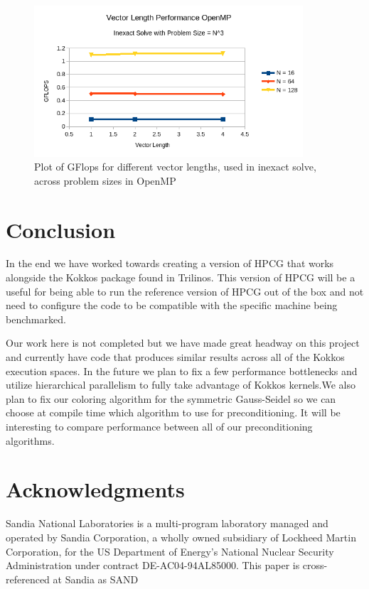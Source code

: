 \documentclass{ccr15}
\begin{document}
\begin{figure}[H]
  \centering
  \includegraphics[width=10cm]{plots/ZAB-VectorLengthOpenMP.png}
  \caption{Plot of GFlops for different vector lengths, used in inexact solve, across problem sizes in OpenMP}
  \label{vlength_openmp}
\end{figure}

\section{Conclusion}
In the end we have worked towards creating a version of HPCG that works alongside the Kokkos
package found in Trilinos. This version of HPCG will be a useful for being able to run the reference
version of HPCG out of the box and not need to configure the code to be compatible with the
specific machine being benchmarked.

Our work here is not completed but we have made great headway on this project and currently have
code that produces similar results across all of the Kokkos execution spaces. In the future we plan to
fix a few performance bottlenecks and utilize hierarchical parallelism to fully take advantage of Kokkos
kernels.We also plan to fix our coloring algorithm for the symmetric Gauss-Seidel so we can choose at
compile time which algorithm to use for preconditioning. It will be interesting to compare performance
between all of our preconditioning algorithms.
\section{Acknowledgments}
Sandia National Laboratories is a multi-program laboratory managed and operated by Sandia Corporation, a wholly owned subsidiary of Lockheed Martin Corporation, for the US Department of Energy{'}s National Nuclear Security Administration under contract DE-AC04-94AL85000. This paper is cross-referenced at Sandia as SAND


\nocite{ZAB:TechHPCG}
\nocite{ZAB:TechHPCG2}
\nocite{ZAB:Kokkos}
\nocite{ZAB:Trilinos}
\nocite{ZAB:Top500}
\nocite{ZAB:CUDA}
\nocite{ZAB:OpenMP}
\nocite{ZAB:PThreads}
\nocite{ZAB:SYMGS}

%
\end{document}
